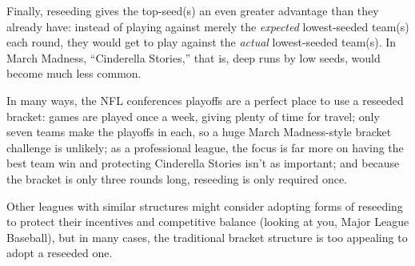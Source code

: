 {Finally, reseeding gives the top-seed(s) an even greater advantage than they already have: instead of playing against merely the \textit{expected} lowest-seeded team(s) each round, they would get to play against the \textit{actual} lowest-seeded team(s). In March Madness, ``Cinderella Stories,'' that is, deep runs by low seeds, would become much less common.

In many ways, the NFL conferences playoffs are a perfect place to use a reseeded bracket: games are played once a week, giving plenty of time for travel; only seven teams make the playoffs in each, so a huge March Madness-style bracket challenge is unlikely; as a professional league, the focus is far more on having the best team win and protecting Cinderella Stories isn't as important; and because the bracket is only three rounds long, reseeding is only required once.

Other leagues with similar structures might consider adopting forms of reseeding to protect their incentives and competitive balance (looking at you, Major League Baseball), but in many cases, the traditional bracket structure is too appealing to adopt a reseeded one.
}